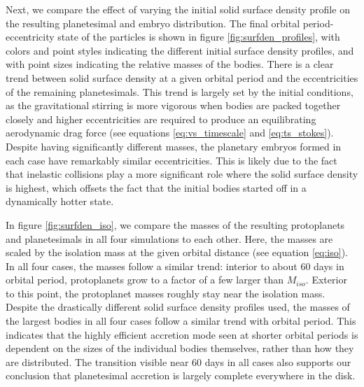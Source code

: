 \documentclass[twocolumn]{aastex63}
\begin{document}


Next, we compare the effect of varying the initial solid surface
density profile on the resulting planetesimal and embryo
distribution. The final orbital period-eccentricity state of the
particles is shown in figure \ref{fig:surfden_profiles}, with colors
and point styles indicating the different initial surface density profiles,
and with point sizes indicating the relative masses of the bodies. There is a clear trend between solid surface density at a given orbital period and the eccentricities of the remaining planetesimals. This trend is largely set by the initial conditions, as the gravitational stirring is more vigorous when bodies are packed together closely and higher eccentricities are required to produce an equilibrating aerodynamic drag force (see equations \ref{eq:vs_timescale} and \ref{eq:ts_stokes}). Despite having significantly different masses, the planetary embryos formed in each case have remarkably similar eccentricities. This is likely due to the fact that inelastic collisions play a more significant role where the solid surface density is highest, which offsets the fact that the initial bodies started off in a dynamically hotter state.


In figure \ref{fig:surfden_iso}, we compare the masses of the resulting protoplanets and planetesimals in all four simulations to each other. Here, the masses are scaled by the isolation mass at the given orbital distance (see equation \ref{eq:iso}). In all four cases, the masses follow a similar trend: interior to about 60 days in orbital period, protoplanets grow to a factor of a few larger than $M_{iso}$. Exterior to this point, the protoplanet masses roughly stay near the isolation mass. Despite the drastically different solid surface density profiles used, the masses of the largest bodies in all four cases follow a similar trend with orbital period. This indicates that the highly efficient accretion mode seen at shorter orbital periods is dependent on the sizes of the individual bodies themselves, rather than how they are distributed. The transition visible near 60 days in all cases also supports our conclusion that planetesimal accretion is largely complete everywhere in the disk.
\end{document}
